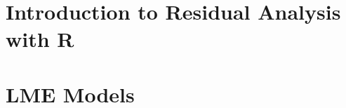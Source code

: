 \documentclass[]{article}
\title{}
\author{}
\begin{document}
\large

\section{Introduction to Residual Analysis with R}



\newpage


 
\newpage


\newpage

\section{LME Models}




\end{document}
